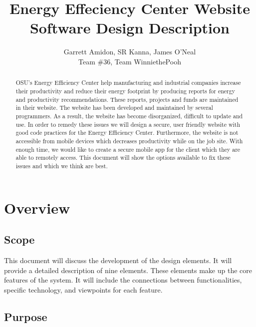 \documentclass[letterpaper,10pt,titlepage,journal,compsoc,draftclsnofoot,onecolumn]{IEEEtran}
\title{Energy Effeciency Center Website \\
	\large Software Design Description}
\author{Garrett Amidon, SR Kanna, James O'Neal\\ Team \#36, Team WinniethePooh}
\begin{document}
\begin{titlingpage}
    \maketitle
	\centering{}
    \begin{abstract}
        
        OSU's Energy Efficiency Center help manufacturing and industrial companies increase their productivity and reduce their energy footprint by producing reports for energy and productivity recommendations. These reports, projects and funds are maintained in their website. The website has been developed and maintained by several programmers. As a result, the website has become disorganized, difficult to update and use. In order to remedy these issues we will design a secure, user friendly website with good code practices for the Energy Efficiency Center. Furthermore, the website is not accessible from mobile devices which decreases productivity while on the job site. With enough time, we would like to create a secure mobile app for the client which they are able to remotely access. This document will show the options available to fix these issues and which we think are best. 
        
    \end{abstract}
\end{titlingpage}

\newpage

\tableofcontents{}

\newpage


\section{Overview}

\subsection{Scope}

This document will discuss the development of the design elements. It will provide a detailed description of nine elements. These elements make up the core features of the system. It will include the connections between functionalities, specific technology, and viewpoints for each feature.

\subsection{Purpose}
\end{document}
